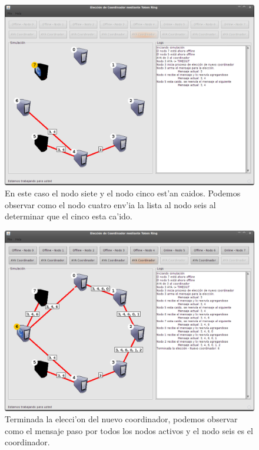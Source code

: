 \begin{figure}[h!]
\centering
 \includegraphics[scale=0.33,keepaspectratio=true]{./imagenes/tokenRing/token7.png}
 \caption{En este caso el nodo siete y el nodo cinco est'an caidos. Podemos observar como el nodo cuatro env'ia la lista al nodo seis al determinar que el cinco esta ca'ido.}
\end{figure}
\newpage

\begin{figure}[h!]
\centering
 \includegraphics[scale=0.33,keepaspectratio=true]{./imagenes/tokenRing/token8.png}
 \caption{Terminada la elecci'on del nuevo coordinador, podemos observar como el mensaje paso por todos los nodos activos y el nodo seis es el coordinador.}
\end{figure}

